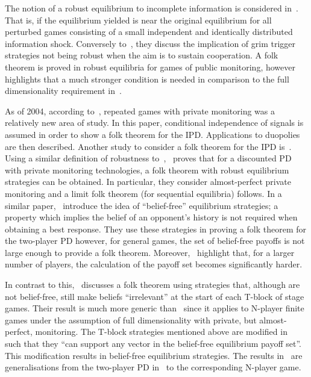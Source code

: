 The notion of a robust equilibrium to incomplete
information is considered in~\cite{Chassang2011}. That is, if the equilibrium
yielded is near the original equilibrium for all perturbed games consisting of a
small independent and identically distributed information shock. Conversely to~\cite{Friedman1971},
they discuss the implication of grim trigger strategies not being robust when
the aim is to sustain cooperation. A folk theorem is proved in robust equilibria
for games of public monitoring, however~\cite{Chassang2011} highlights that a
much stronger condition is needed in comparison to the full dimensionality
requirement in~\cite{Maskin1994}.

As of 2004, according to~\cite{Matsushima2004}, repeated games with private
monitoring was a relatively new area of study. In this paper, conditional
independence of signals
is assumed in order to show a folk theorem for the IPD\@. Applications to
duopolies are then described. Another study to consider a folk theorem for the
IPD is~\cite{Ely2002}. Using a similar definition of robustness
to~\cite{Chassang2011},~\cite{Ely2002} proves that for a discounted PD with private monitoring technologies, a folk theorem with robust
equilibrium strategies can be obtained. In particular, they consider
almost-perfect private monitoring and a limit folk theorem (for sequential
equilibria) follows. In a similar paper,~\cite{Ely2005} introduce the idea of
``belief-free'' equilibrium strategies; a property which implies the belief of
an opponent's history is not required when obtaining a best response. They use
these strategies in proving a folk theorem for the two-player PD
however, for general games, the set of belief-free payoffs is not large enough
to provide a folk theorem. Moreover,~\cite{Ely2005} highlight that, for a larger
number of players, the calculation of the payoff set becomes significantly
harder.

In contrast to this,~\cite{Hoerner2006} discusses a folk theorem using
strategies that, although are not belief-free, still make beliefs ``irrelevant''
at the start of each T-block of stage games. Their result is much more generic
than~\cite{Ely2005} since it applies to N-player finite games under the
assumption of full dimensionality with private, but almost-perfect, monitoring.
The T-block strategies mentioned above are modified in~\cite{Yamamoto2009,Yamamoto2012} such that they ``can support any vector in the belief-free
equilibrium payoff set''. This modification results in belief-free equilibrium
strategies. The results in~\cite{Yamamoto2009,Yamamoto2012} are generalisations
from the two-player PD in~\cite{Ely2005} to the corresponding
N-player game.


